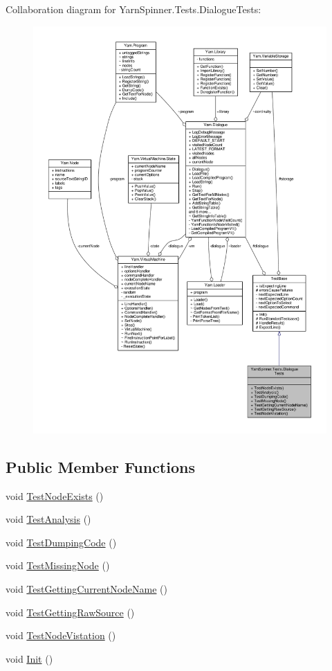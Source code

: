 Collaboration diagram for Yarn\-Spinner.\-Tests.\-Dialogue\-Tests\-:
\nopagebreak
\begin{figure}[H]
\begin{center}
\leavevmode
\includegraphics[width=350pt]{df/df7/a00731}
\end{center}
\end{figure}
\subsection*{Public Member Functions}
\begin{DoxyCompactItemize}
\item 
void \hyperlink{a00074_a9d4171827bf3eba4c6ae52760a475f45}{Test\-Node\-Exists} ()
\item 
void \hyperlink{a00074_a40b0efb3cac1715b44640c29988139f1}{Test\-Analysis} ()
\item 
void \hyperlink{a00074_a111f0f8418baaeaf83cfb422c90210e0}{Test\-Dumping\-Code} ()
\item 
void \hyperlink{a00074_a013d5e3847b9d716b39aa925d70b99fd}{Test\-Missing\-Node} ()
\item 
void \hyperlink{a00074_afbb342ea64e33ee19d42a6a2c949592a}{Test\-Getting\-Current\-Node\-Name} ()
\item 
void \hyperlink{a00074_a16ed34de323da529e1a17670f556791c}{Test\-Getting\-Raw\-Source} ()
\item 
void \hyperlink{a00074_a9c0d2732044b273929dbce35358a1906}{Test\-Node\-Vistation} ()
\item 
void \hyperlink{a00146_a357a0dab579f9e45666c10779683dc27}{Init} ()
\end{DoxyCompactItemize}

